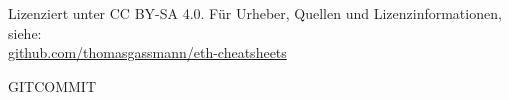
\begin{center}
    Lizenziert unter CC BY-SA 4.0. Für Urheber, Quellen und Lizenzinformationen, siehe:\\
    \href{https://github.com/thomasgassmann/eth-cheatsheets}{github.com/thomasgassmann/eth-cheatsheets}

    GITCOMMIT
\end{center}
